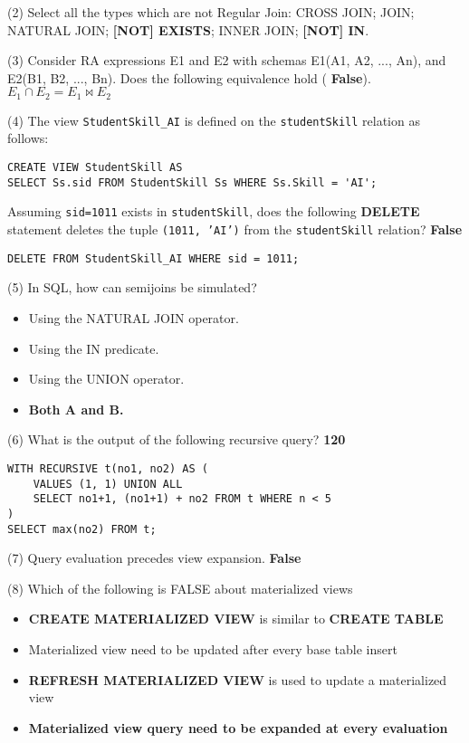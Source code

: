 \documentclass[10pt,landscape]{article}
\newcommand{\sql}[1]{{\color{cyan} \textbf{#1}}}
\newcommand{\ans}[1]{{\color{purple} \textbf{#1}}}
\newcommand{\exmp}[1]{{\texttt{#1}}}
\begin{document}
\begin{multicols}{4}
(2) Select all the types which are not Regular Join: CROSS JOIN; JOIN; NATURAL JOIN; \ans{[NOT] EXISTS}; INNER JOIN; \ans{[NOT] IN}.

(3) Consider RA expressions E1 and E2 with schemas E1(A1, A2, ..., An), and E2(B1, B2, ..., Bn). Does the following equivalence hold (\ans{False}). $E_1 \cap E_2 = E_1 \bowtie E_2$

(4) The view \exmp{StudentSkill\_AI} is defined on the \exmp{studentSkill} relation as follows:

\begin{lstlisting}
CREATE VIEW StudentSkill AS
SELECT Ss.sid FROM StudentSkill Ss WHERE Ss.Skill = 'AI';
\end{lstlisting}

Assuming \exmp{sid=1011} exists in \exmp{studentSkill}, does the following \sql{DELETE} statement deletes the tuple \exmp{(1011, 'AI')} from the \exmp{studentSkill} relation? \ans{False}

\begin{lstlisting}
DELETE FROM StudentSkill_AI WHERE sid = 1011;
\end{lstlisting}

(5) In SQL, how can semijoins be simulated?

\begin{itemize}
	\item Using the NATURAL JOIN operator. 
	\item Using the IN predicate. 
	\item Using the UNION operator. 
	\item \ans{Both A and B.}

\end{itemize}

(6) What is the output of the following recursive query? \ans{120}

\begin{lstlisting}
WITH RECURSIVE t(no1, no2) AS (
    VALUES (1, 1) UNION ALL
    SELECT no1+1, (no1+1) + no2 FROM t WHERE n < 5
)
SELECT max(no2) FROM t;
\end{lstlisting}

(7) Query evaluation precedes view expansion. \ans{False}

(8) Which of the following is FALSE about materialized views
  
\begin{itemize}
\item \sql{CREATE MATERIALIZED VIEW} is similar to \sql{CREATE TABLE} 
\item Materialized view need to be updated after every base table insert 
\item \sql{REFRESH MATERIALIZED VIEW} is used to update a materialized view 
\item \ans{Materialized view query need to be expanded at every evaluation}
\end{itemize} 


\end{multicols}
\end{document}
